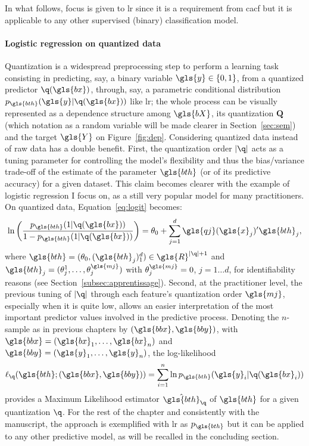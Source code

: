 In what follows, focus is given to \gls{lr} since it is a requirement from \gls{cacf} but it is applicable to any other supervised (binary) classification model.

\paragraph{Logistic regression on quantized data}

Quantization is a widespread preprocessing step to perform a learning task consisting in predicting, say, a binary variable $\gls{y}\in\{0,1\}$, from a quantized predictor  $\q(\gls{bx})$, through, say, a parametric conditional distribution $p_{\gls{bth}}(\gls{y}|\q(\gls{bx}))$ like \gls{lr}; the whole process can be visually represented as a dependence structure among $\gls{bX}$, its quantization $\bm{Q}$ (which notation as a random variable will be made clearer in Section~\ref{sec:sem}) and the target $\gls{Y}$ on Figure~\ref{fig:dep}. Considering quantized data instead of raw data has a double benefit. First, the quantization order $|\q|$ acts as a tuning parameter for controlling the model's flexibility and thus the bias/variance trade-off of the estimate of the parameter $\gls{bth}$ (or of its predictive accuracy) for a given dataset. This claim becomes clearer with the example of logistic regression I focus on, as a still very popular model for many practitioners. On quantized data, Equation~\eqref{eq:logit} becomes:
\begin{equation}
    \label{eq:reglogq}
\ln \left( \dfrac{p_{\gls{bth}}(1|\q(\gls{bx}))}{1 - p_{\gls{bth}}(1|\q(\gls{bx}))} \right) = \theta_0 + \sum_{j=1}^d \gls{qj}(\gls{x}_j)' \gls{bth}_j,
\end{equation}
where $\gls{bth} = (\theta_{0},(\gls{bth}_j)_1^d) \in \gls{R}^{|\q|+1}$ and $\gls{bth}_j = (\theta_{j}^{1},\dots,\theta_{j}^{\gls{mj}})$ with $\theta_{j}^{\gls{mj}} = 0$, $j=1 \ldots d$, for identifiability reasons (see Section~\ref{subsec:apprentissage}).
Second, at the practitioner level, the previous tuning of $|\q|$ through each feature's quantization order $\gls{mj}$, especially when it is quite low, allows an easier interpretation of the most important predictor values involved in the predictive process. Denoting the $n$-sample as in previous chapters by $(\gls{bbx},\gls{bby})$, with $\gls{bbx}=(\gls{bx}_1,\ldots,\gls{bx}_n)$ and $\gls{bby}=(\gls{y}_1,\ldots,\gls{y}_n)$, the log-likelihood 
\begin{equation}
\label{eq:lq}
\ell_{\q}(\gls{bth} ; (\gls{bbx},\gls{bby}))=\sum_{i=1}^n \ln p_{\gls{bth}}(\gls{y}_i|\q(\gls{bx}_i))
\end{equation}
provides a Maximum Likelihood estimator $\hat{\gls{bth}}_{\q}$ of $\gls{bth}$ for a given quantization $\q$. For the rest of the chapter and consistently with the manuscript, the approach is exemplified with \gls{lr} as $p_{\gls{bth}}$ but it can be applied to any other predictive model, as will be recalled in the concluding section.

